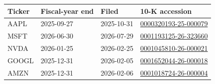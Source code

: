 \begin{tabular}{@{}llll@{}}
\toprule
Ticker & Fiscal-year end & Filed & 10-K accession \\
\midrule
AAPL & 2025-09-27 & 2025-10-31 & \href{https://www.sec.gov/Archives/edgar/data/320193/0000320193-25-000079-index.html}{0000320193-25-000079} \\
MSFT & 2026-06-30 & 2026-07-29 & \href{https://www.sec.gov/Archives/edgar/data/789019/0001193125-26-323660-index.html}{0001193125-26-323660} \\
NVDA & 2026-01-25 & 2026-02-25 & \href{https://www.sec.gov/Archives/edgar/data/1045810/0001045810-26-000021-index.html}{0001045810-26-000021} \\
GOOGL & 2025-12-31 & 2026-02-05 & \href{https://www.sec.gov/Archives/edgar/data/1652044/0001652044-26-000018-index.html}{0001652044-26-000018} \\
AMZN & 2025-12-31 & 2026-02-06 & \href{https://www.sec.gov/Archives/edgar/data/1018724/0001018724-26-000004-index.html}{0001018724-26-000004} \\
\bottomrule
\end{tabular}
